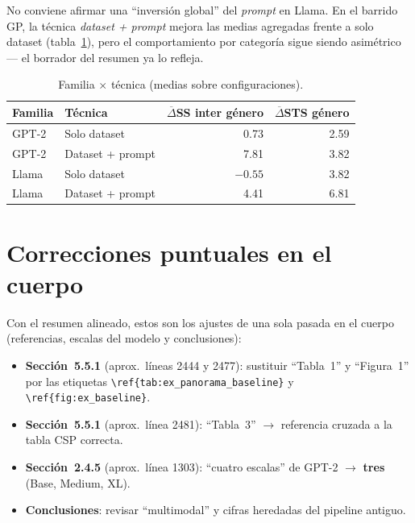 \documentclass[11pt,a4paper]{article}
\begin{document}
No conviene afirmar una ``inversión global'' del \emph{prompt} en Llama. En el barrido GP, la técnica
\emph{dataset + prompt} mejora las medias agregadas frente a solo dataset (tabla~\ref{tab:plan_familia}),
pero el comportamiento por categoría sigue siendo asimétrico --- el borrador del resumen ya lo refleja.

\begin{table}[ht]
\centering\small
\caption{Familia $\times$ técnica (medias sobre configuraciones).}
\label{tab:plan_familia}
\begin{tabular}{@{}llrr@{}}
\toprule
\textbf{Familia} & \textbf{Técnica} & $\overline{\Delta}$SS inter género & $\overline{\Delta}$STS género \\
\midrule
GPT-2 & Solo dataset & 0.73 & 2.59 \\
GPT-2 & Dataset + prompt & 7.81 & 3.82 \\
Llama & Solo dataset & $-0.55$ & 3.82 \\
Llama & Dataset + prompt & 4.41 & 6.81 \\
\bottomrule
\end{tabular}
\end{table}

\section{Correcciones puntuales en el cuerpo}
\label{sec:puntuales}

Con el resumen alineado, estos son los ajustes de una sola pasada en el cuerpo (referencias, escalas del
modelo y conclusiones):

\begin{itemize}[leftmargin=*, itemsep=0.4em]
  \item \textbf{Sección~5.5.1} (aprox.\ líneas 2444 y 2477): sustituir ``Tabla~1'' y ``Figura~1'' por
        las etiquetas \texttt{\textbackslash ref\{tab:ex\_panorama\_baseline\}} y
        \texttt{\textbackslash ref\{fig:ex\_baseline\}}.
  \item \textbf{Sección~5.5.1} (aprox.\ línea 2481): ``Tabla~3'' $\rightarrow$ referencia cruzada a la tabla CSP correcta.
  \item \textbf{Sección~2.4.5} (aprox.\ línea 1303): ``cuatro escalas'' de GPT-2 $\rightarrow$ \textbf{tres} (Base, Medium, XL).
  \item \textbf{Conclusiones}: revisar ``multimodal'' y cifras heredadas del pipeline antiguo.
\end{itemize}
\end{document}
